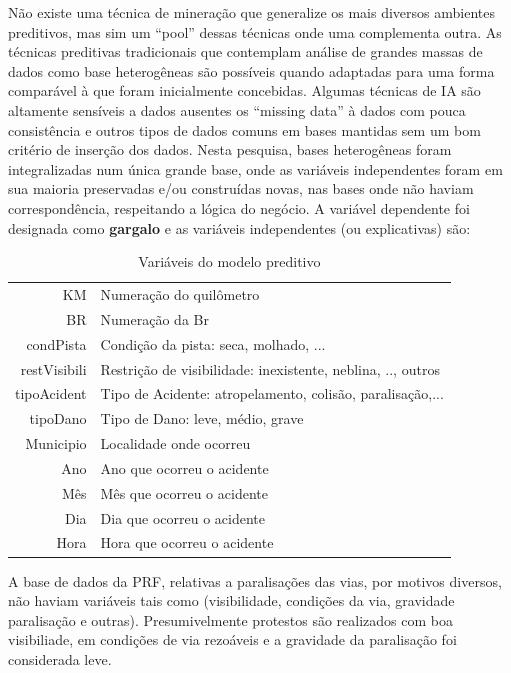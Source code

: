 Não existe uma técnica de mineração que generalize os mais diversos ambientes preditivos, mas sim um ``pool'' dessas técnicas onde uma complementa outra.
As técnicas preditivas tradicionais que contemplam análise de grandes massas de dados como base heterogêneas são possíveis quando adaptadas para uma forma comparável à que
foram inicialmente concebidas. Algumas técnicas de IA são altamente sensíveis a dados ausentes os ``missing data'' à dados com pouca consistência e outros tipos de dados 
comuns em bases mantidas sem um bom critério de inserção dos dados. Nesta pesquisa, bases heterogêneas foram integralizadas num única grande base, onde as variáveis independentes foram
em sua maioria preservadas e/ou construídas novas, nas bases onde não haviam correspondência, respeitando a lógica do negócio. 
A variável dependente foi designada como \textbf{gargalo} e as variáveis independentes (ou explicativas) são:

\begin{table}[htbp]
  \caption{Variáveis do modelo preditivo}
  
  \begin{tabular}{r|l} \hline
   KM & Numeração do quilômetro \\
    BR & Numeração da Br\\
    condPista & Condição da pista: seca, molhado, ... \\
    restVisibili & Restrição de visibilidade: inexistente, neblina, .., outros \\
    tipoAcident & Tipo de Acidente: atropelamento, colisão, paralisação,...\\
    tipoDano  & Tipo de Dano: leve, médio, grave \\
    Municipio  & Localidade onde ocorreu \\
    Ano & Ano que ocorreu o acidente \\
    Mês & Mês que ocorreu o acidente \\
    Dia & Dia que ocorreu o acidente \\
    Hora & Hora que ocorreu o acidente \\
  \end{tabular}
\end{table}

 
A base de dados da PRF, relativas a paralisações das vias, por motivos diversos, não haviam variáveis tais como (visibilidade, condições da via, gravidade paralisação e outras).
Presumivelmente protestos são realizados com boa visibiliade, em condições de via rezoáveis e a gravidade da paralisação foi considerada leve.

